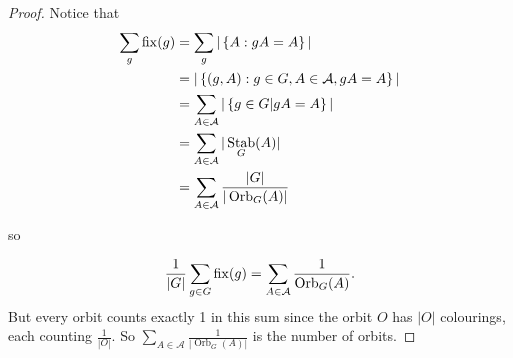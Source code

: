 \documentclass{article}
\theoremstyle{definition} \newtheorem*{definition}{Definition}
\DeclareMathOperator{\Orb}{Orb} \DeclareMathOperator{\Stab}{Stab}
\DeclareMathOperator{\fix}{fix} \DeclareMathOperator{\ord}{\text{ord}}
\begin{document}
   \begin{proof} Notice that \begin{align*} \sum_g \fix(g) &= \sum_g |\left\{ A
       : gA = A \right\}| \\ &= |\left\{ (g,A) : g \in G, A \in
         \mathcal{A},gA=A \right\}|\\ &= \sum_{A \in \mathcal{A}}|\left\{ g \in
         G | gA = A \right\}|\\ &= \sum_{A \in \A} |\Stab_G(A)|\\ &= \sum_{A
         \in \A} \frac{|G|}{|\Orb_G(A)|} \end{align*}

so

\begin{align*} \frac{1}{|G|}\sum_{g \in G} \fix(g) = \sum_{A \in \A}
  \frac{1}{\Orb_G(A)}.  \end{align*} But every orbit counts exactly 1 in this
sum since the orbit $O$ has $|O|$ colourings, each counting $\frac{1}{|O|}$. So
$\sum_{A \in \mathcal{A}}\frac{1}{|\Orb_G(A)|}$ is the number of orbits.
\end{proof}
\end{document}
